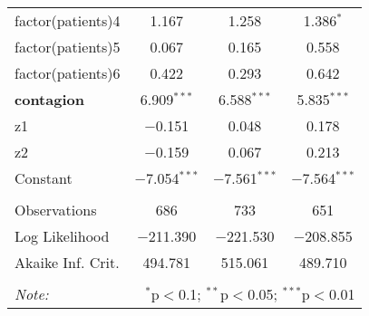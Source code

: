 \documentclass[11pt]{article}
\begin{document}
\begin{table}[!htbp]
\begin{tabular}{@{\extracolsep{5pt}}lccc}
  factor(patients)4 & 1.167 & 1.258 & 1.386$^{*}$ \\ 
  factor(patients)5 & 0.067 & 0.165 & 0.558 \\ 
  factor(patients)6 & 0.422 & 0.293 & 0.642 \\ 
 \textbf{contagion} & 6.909$^{***}$ & 6.588$^{***}$ & 5.835$^{***}$ \\ 
  z1 & $-$0.151 & 0.048 & 0.178 \\ 
  z2 & $-$0.159 & 0.067 & 0.213 \\ 
  Constant & $-$7.054$^{***}$ & $-$7.561$^{***}$ & $-$7.564$^{***}$ \\ 
 \hline \\[-1.8ex] 
Observations & 686 & 733 & 651 \\ 
Log Likelihood & $-$211.390 & $-$221.530 & $-$208.855 \\ 
Akaike Inf. Crit. & 494.781 & 515.061 & 489.710 \\ 
\hline 
\hline \\[-1.8ex] 
\textit{Note:}  & \multicolumn{3}{r}{$^{*}$p$<$0.1; $^{**}$p$<$0.05; $^{***}$p$<$0.01} \\ 
\end{tabular} 
\end{table} 
\end{document}
